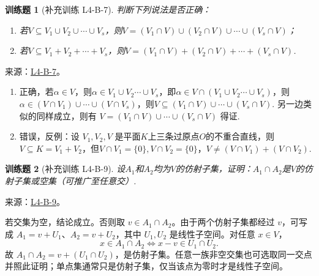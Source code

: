 \documentclass[UTF8,12pt,a4paper,fontset=fandol]{ctexart}
\newtheorem{exercise}{训练题}[section]
\begin{document}
\begin{exercise}[补充训练 L4-B-7]\label{prob:L4-B-7}
判断下列说法是否正确：
        \begin{enumerate}
            \item 若$V \subseteq V_1 \cup V_2 \cup \cdots \cup V_s$，则$V=(V_1 \cap V)\cup(V_2 \cap V)\cup\cdots\cup(V_s \cap V)$；

            \item 若$V \subseteq V_1+V_2+\cdots +V_s$，则$V=(V_1 \cap V)+(V_2 \cap V)+\cdots+(V_s \cap V)$.
        \end{enumerate}
\end{exercise}
\noindent 来源：\href{https://github.com/yhwu-is/Linear-Algebra-Left-Undone/blob/new/%E8%AE%B2%E4%B9%89/%E4%B8%93%E9%A2%98/4%20%E7%BA%BF%E6%80%A7%E7%A9%BA%E9%97%B4%E7%9A%84%E8%BF%90%E7%AE%97.tex}{L4-B-7}。
\begin{solve}
\begin{enumerate}
              \item 正确，若$\alpha\in V$，则$\alpha \in V_1\cup V_2\cdots \cup V_s$，即$\alpha \in V\cap (V_1\cup V_2\cdots \cup V_s)$，则$\alpha \in (V\cap V_1)\cup \cdots \cup (V\cap V_s)$，则$V\subseteq(V_1\cap V)\cup \cdots \cup (V_s\cap V)$. 另一边类似的同样成立，则有 $V=(V_1\cap V)\cup \cdots \cup (V_s\cap V)$ 得证.

              \item 错误，反例：设 $V_1,V_2,V$ 是平面$K$上三条过原点$O$的不重合直线，则$V\subseteq K=V_1+V_2$，但$V\cap V_1=\{0\},V\cap V_2=\{0\}$，$V\ne (V\cap V_1)+(V\cap V_2)$.
          \end{enumerate}
\end{solve}

\begin{exercise}[补充训练 L4-B-9]\label{prob:L4-B-9}
设$A_1$和$A_2$均为$V$的仿射子集，证明：$A_1\cap A_2$是$V$的仿射子集或空集（可推广至任意交）.
\end{exercise}
\noindent 来源：\href{https://github.com/yhwu-is/Linear-Algebra-Left-Undone/blob/new/%E8%AE%B2%E4%B9%89/%E4%B8%93%E9%A2%98/4%20%E7%BA%BF%E6%80%A7%E7%A9%BA%E9%97%B4%E7%9A%84%E8%BF%90%E7%AE%97.tex}{L4-B-9}。
\begin{solve}
若交集为空，结论成立。否则取 $v\in A_1\cap A_2$。由于两个仿射子集都经过 $v$，可写成 $A_1=v+U_1$、$A_2=v+U_2$，其中 $U_1,U_2$ 是线性子空间。对任意 $x\in V$，
\[x\in A_1\cap A_2\iff x-v\in U_1\cap U_2.\]
故 $A_1\cap A_2=v+(U_1\cap U_2)$，是仿射子集。任意一族非空交集也可选取同一交点并照此证明；单点集通常只是仿射子集，仅当该点为零时才是线性子空间。
\end{solve}
\end{document}
